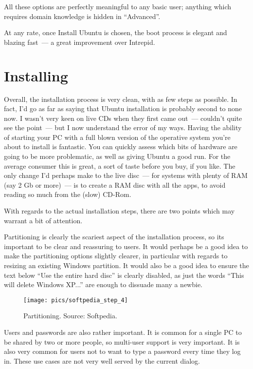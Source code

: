 \documentclass{memoir}
\begin{document}
All these options are perfectly meaningful to any basic user; anything
which requires domain knowledge is hidden in ``Advanced''.

At any rate, once Install Ubuntu is chosen, the boot process is
elegant and blazing fast~--- a great improvement over Intrepid.

\section{Installing}

Overall, the installation process is very clean, with as few steps as
possible. In fact, I'd go as far as saying that Ubuntu installation is
probably second to none now. I wasn't very keen on live CDs when they
first came out~--- couldn't quite see the point~--- but I now
understand the error of my ways. Having the ability of starting your
PC with a full blown version of the operative system you're about to
install is fantastic. You can quickly assess which bits of hardware
are going to be more problematic, as well as giving Ubuntu a good
run. For the average consumer this is great, a sort of taste before
you buy, if you like. The only change I'd perhaps make to the live
disc~--- for systems with plenty of RAM (say 2 Gb or more)~--- is to
create a RAM disc with all the apps, to avoid reading so much from the
(slow) CD-Rom.

With regards to the actual installation steps, there are two points
which may warrant a bit of attention.

Partitioning is clearly the scariest aspect of the installation
process, so its important to be clear and reassuring to users. It
would perhaps be a good idea to make the partitioning options slightly
clearer, in particular with regards to resizing an existing Windows
partition. It would also be a good idea to ensure the text below ``Use
the entire hard disc'' is clearly disabled, as just the words ``This
will delete Windows XP...'' are enough to dissuade many a newbie.

\begin{figure}
\begin{center}
\texttt{[image: pics/softpedia\_step\_4]}
\end{center}
\caption{Partitioning. Source: Softpedia.}
\end{figure}

Users and passwords are also rather important. It is common for a
single PC to be shared by two or more people, so multi-user support is
very important. It is also very common for users not to want to type a
password every time they log in. These use cases are not very well
served by the current dialog.
\end{document}
